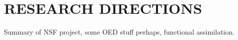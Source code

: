\chapter{\uppercase{Research Directions} \label{chapter:05}}

Summary of NSF project, some OED stuff perhaps, functional assimilation.
